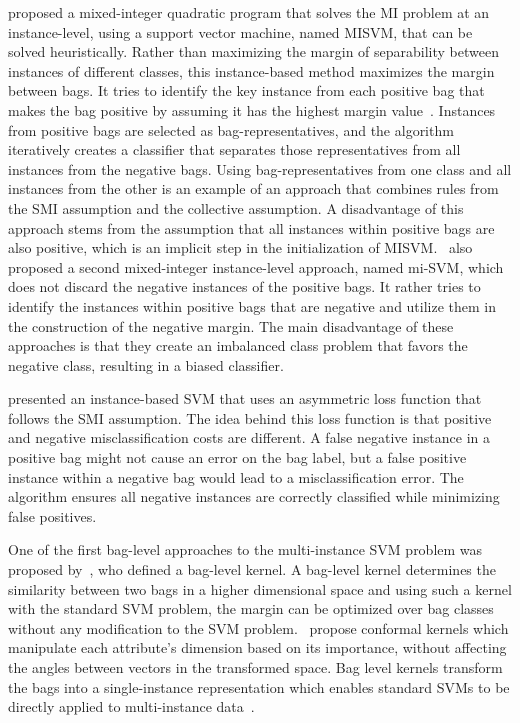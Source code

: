 \cite{Andrews2002} proposed a mixed-integer quadratic program that solves the MI problem at an instance-level, using a support vector machine, named MISVM, that can be solved heuristically. Rather than maximizing the margin of separability between instances of different classes, this instance-based method maximizes the margin between bags. It tries to identify the key instance from each positive bag that makes the bag positive by assuming it has the highest margin value~\citep{Herrera2016}. Instances from positive bags are selected as bag-representatives, and the algorithm iteratively creates a classifier that separates those representatives from all instances from the negative bags. Using bag-representatives from one class and all instances from the other is an example of an approach that combines rules from the SMI assumption and the collective assumption. A disadvantage of this approach stems from the assumption that all instances within positive bags are also positive, which is an implicit step in the initialization of MISVM.~\cite{Andrews2002} also proposed a second mixed-integer instance-level approach, named mi-SVM, which does not discard the negative instances of the positive bags. It rather tries to identify the instances within positive bags that are negative and utilize them in the construction of the negative margin. The main disadvantage of these approaches is that they create an imbalanced class problem that favors the negative class, resulting in a biased classifier.

\cite{Yang2006} presented an instance-based SVM that uses an asymmetric loss function that follows the SMI assumption. The idea behind this loss function is that positive and negative misclassification costs are different. A false negative instance in a positive bag might not cause an error on the bag label, but a false positive instance within a negative bag would lead to a misclassification error. The algorithm ensures all negative instances are correctly classified while minimizing false positives.

One of the first bag-level approaches to the multi-instance SVM problem was proposed by~\cite{Smola2002}, who defined a bag-level kernel. A bag-level kernel determines the similarity between two bags in a higher dimensional space and using such a kernel with the standard SVM problem, the margin can be optimized over bag classes without any modification to the SVM problem.~\cite{Blaschko2006} propose conformal kernels which manipulate each attribute's dimension based on its importance, without affecting the angles between vectors in the transformed space. Bag level kernels transform the bags into a single-instance representation which enables standard SVMs to be directly applied to multi-instance data~\citep{Herrera2016}. 

